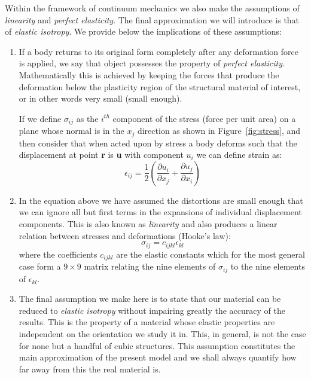 Within the framework of continuum mechanics we also make the assumptions of \textit{linearity} and \textit{perfect elasticity}. The final approximation we will introduce is that of \textit{elastic isotropy}. We provide below the implications of these assumptions:
\begin{enumerate}
\item If a body returns to its original form completely after any deformation force is applied, we say that object possesses the property of \textit{perfect elasticity}. Mathematically this is achieved by keeping the forces that produce the deformation below the plasticity region of the structural material of interest, or in other words very small (small enough).

If we define $\sigma_{ij}$ as the $i^{th}$ component of the stress (force per unit area) on a plane whose normal is in the $x_{j}$ direction as shown in Figure~\ref{fig:stress}, and then consider that when acted upon by stress a body deforms such that the displacement at point \textbf{r} is \textbf{u} with component $u_{i}$ we can define strain as:
\begin{equation}
\label{eq:epsilon}
\epsilon_{ij}=\dfrac{1}{2}\left(\dfrac{\partial u_i}{\partial x_j} + \dfrac{\partial u_j}{\partial x_i}\right)
\end{equation}

\item In the equation above we have assumed the distortions are small enough that we can ignore all but first terms in the expansions of individual displacement components. This is also known as \textit{linearity} and also produces a linear relation between stresses and deformations (Hooke's law):
\begin{equation}
\label{eq:sigma}
\sigma_{ij}=c_{ijkl}\epsilon_{kl}
\end{equation}
where the coefficients $c_{ijkl}$ are the elastic constants which for the most general case form a $9\times9$ matrix relating the nine elements of $\sigma_{ij}$ to the nine elements of $\epsilon_{kl}$.

\item The final assumption we make here is to state that our material can be reduced to \textit{elastic isotropy} without impairing greatly the accuracy of the results. This is the property of a material whose elastic properties are independent on the orientation we study it in. This, in general, is not the case for none but a handful of cubic structures. This assumption constitutes the main approximation of the present model and we shall always quantify how far away from this the real material is.
\end{enumerate}


